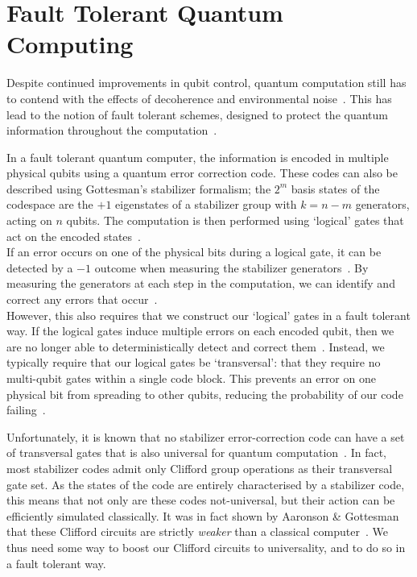 \documentclass{standalone}
\begin{document}
\section{Fault Tolerant Quantum Computing}\label{sec:FTQC}
Despite continued improvements in qubit control, quantum computation still has to contend with the effects of decoherence and environmental noise~\cite{Nielsen2000}. This has lead to the notion of fault tolerant schemes, designed to protect the quantum information throughout the computation~\cite{Nielsen2000}. 
\par
In a fault tolerant quantum computer, the information is encoded in multiple physical qubits using a quantum error correction code. These codes can also be described using Gottesman's stabilizer formalism; the $2^{m}$ basis states of the codespace are the $+1$ eigenstates of a stabilizer group with $k=n-m$ generators, acting on $n$ qubits. The computation is then performed using `logical' gates that act on the encoded states~\cite{Gottesman1997}.\\
If an error occurs on one of the physical bits during a logical gate, it can be detected by a $-1$ outcome when measuring the stabilizer generators~\cite{Gottesman1997}. By measuring the generators at each step in the computation, we can identify and correct any errors that occur~\cite{Nielsen2000}.\\
However, this also requires that we construct our `logical' gates in a fault tolerant way. If the logical gates induce multiple errors on each encoded qubit, then we are no longer able to deterministically detect and correct them~\cite{Gottesman2009}. Instead, we typically require that our logical gates be `transversal': that they require no multi-qubit gates within a single code block. This prevents an error on one physical bit from spreading to other qubits, reducing the probability of our code failing~\cite{Nielsen2000,Gottesman2009}.
\par
Unfortunately, it is known that no stabilizer error-correction code can have a set of transversal gates that is also universal for quantum computation~\cite{Eastin2009}. In fact, most stabilizer codes admit only Clifford group operations as their transversal gate set. As the states of the code are entirely characterised by a stabilizer code, this means that not only are these codes not-universal, but their action can be efficiently simulated classically. It was in fact shown by Aaronson \& Gottesman that these Clifford circuits are strictly \emph{weaker} than a classical computer~\cite{Aaronson2004a}. We thus need some way to boost our Clifford circuits to universality, and to do so in a fault tolerant way. 
\end{document}
